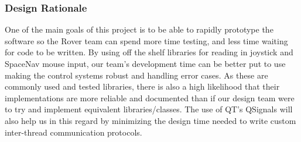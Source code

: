 \subsubsection{Design Rationale}
One of the main goals of this project is to be able to rapidly prototype the software so the Rover team can spend more time testing, and less time waiting for code to be written.
By using off the shelf libraries for reading in joystick and SpaceNav mouse input, our team's development time can be better put to use making the control systems robust and handling error cases.
As these are commonly used and tested libraries, there is also a high likelihood that their implementations are more reliable and documented than if our design team were to try and implement equivalent libraries/classes.
The use of QT's QSignals will also help us in this regard by minimizing the design time needed to write custom inter-thread communication protocols. 